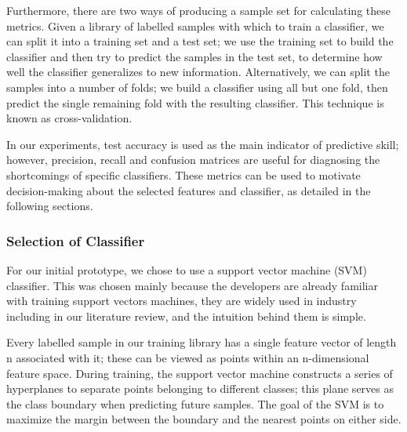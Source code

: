 \documentclass[12pt]{article}
\begin{document}
Furthermore, there are two ways of producing a sample set for calculating these metrics. Given a library of labelled samples with which to train a classifier, we can split it into a training set and a test set; we use the training set to build the classifier and then try to predict the samples in the test set, to determine how well the classifier generalizes to new information. Alternatively, we can split the samples into a number of folds; we build a classifier using all but one fold, then predict the single remaining fold with the resulting classifier. This technique is known as cross-validation.  

In our experiments, test accuracy is used as the main indicator of predictive skill; however, precision, recall and confusion matrices are useful for diagnosing the shortcomings of specific classifiers. These metrics can be used to motivate decision-making about the selected features and classifier, as detailed in the following sections. 

\subsubsection{Selection of Classifier}
For our initial prototype, we chose to use a support vector machine (SVM) classifier. This was chosen mainly because the developers are already familiar with training support vectors machines, they are widely used in industry including in our literature review, and the intuition behind them is simple. 

Every labelled sample in our training library has a single feature vector of length n associated with it; these can be viewed as points within an n-dimensional feature space. During training, the support vector machine constructs a series of hyperplanes to separate points belonging to different classes; this plane serves as the class boundary when predicting future samples. The goal of the SVM is to maximize the margin between the boundary and the nearest points on either side. 
\end{document}
